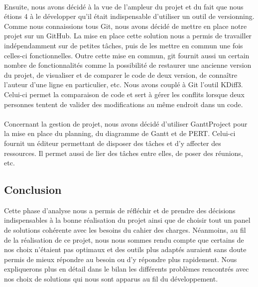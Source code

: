 \documentclass[a4paper,11pt]{article}
\begin{document}
\paragraph{} Ensuite, nous avons décidé à la vue de l'ampleur du projet et du fait que nous étions 4 à le développer qu'il était indispensable d'utiliser un outil de versionning. Comme nous connaissions tous Git, nous avons décidé de mettre en place notre projet sur un GitHub. La mise en place cette solution nous a permis de travailler indépendamment sur de petites tâches, puis de les mettre en commun une fois celles-ci fonctionnelles. Outre cette mise en commun, git fournit aussi un certain nombre de fonctionnalités comme la possibilité de restaurer une ancienne version du projet, de visualiser et de comparer le code de deux version, de connaître l'auteur d'une ligne en particulier, etc. Nous avons couplé à Git l'outil KDiff3. Celui-ci permet la comparaison de code et sert à gérer les conflits lorsque deux personnes tentent de valider des modifications au même endroit dans un code.

\paragraph{} Concernant la gestion de projet, nous avons décidé d'utiliser GanttProject pour la mise en place du planning, du diagramme de Gantt et de PERT. Celui-ci fournit un éditeur permettant de disposer des tâches et d'y affecter des ressources. Il permet aussi de lier des tâches entre elles, de poser des réunions, etc.

\subsection*{Conclusion}
Cette phase d'analyse nous a permis de réfléchir et de prendre des décisions indispensables à la bonne réalisation du projet ainsi que de choisir tout un panel de solutions cohérente avec les besoins du cahier des charges. Néanmoins, au fil de la réalisation de ce projet, nous nous sommes rendu compte que certains de nos choix n'étaient pas optimaux et des outils plus adaptés auraient sans doute permis de mieux répondre au besoin ou d'y répondre plus rapidement. Nous expliquerons plus en détail dans le bilan les différents problèmes rencontrés avec nos choix de solutions qui nous sont apparus au fil du développement.
\end{document}
